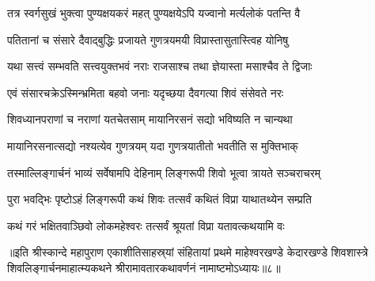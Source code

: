 \twolineshloka
{तत्र स्वर्गसुखं भुक्त्वा पुण्यक्षयकरं महत्}
{पुण्यक्षयेऽपि यज्वानो मर्त्यलोकं पतन्ति वै}%

\twolineshloka
{पतितानां च संसारे दैवाद्बुद्धिः प्रजायते}
{गुणत्रयमयी विप्रास्तासुतास्त्विह योनिषु}%

\twolineshloka
{यथा सत्त्वं सम्भवति सत्त्वयुक्तभवं नराः}
{राजसाश्च तथा ज्ञेयास्ता मसाश्चैव ते द्विजाः}%

\twolineshloka
{एवं संसारचक्रेऽस्मिन्भ्रमिता बहवो जनाः}
{यदृच्छया दैवगत्या शिवं संसेवते नरः}%

\twolineshloka
{शिवध्यानपराणां च नराणां यतचेतसाम्}
{मायानिरसनं सद्यो भविष्यति न चान्यथा}%

\twolineshloka
{मायानिरसनात्सद्यो नश्यत्येव गुणत्रयम्}
{यदा गुणत्रयातीतो भवतीति स मुक्तिभाक्}%

\twolineshloka
{तस्माल्लिङ्गार्चनं भाव्यं सर्वेषामपि देहिनाम्}
{लिङ्गरूपी शिवो भूत्वा त्रायते सञ्चराचरम्}%

\twolineshloka
{पुरा भवद्भिः पृष्टोऽहं लिङ्गरूपी कथं शिवः}
{तत्सर्वं कथितं विप्रा याथातथ्येन सम्प्रति}%

\twolineshloka
{कथं गरं भक्षितवाञ्छिवो लोकमहेश्वरः}
{तत्सर्वं श्रूयतां विप्रा यतावत्कथयामि वः}%

॥इति श्रीस्कान्दे महापुराण एकाशीतिसाहस्र्यां संहितायां प्रथमे माहेश्वरखण्डे केदारखण्डे शिवशास्त्रे शिवलिङ्गार्चनमाहात्म्यकथने श्रीरामावतारकथावर्णनं नामाष्टमोऽध्यायः॥८॥